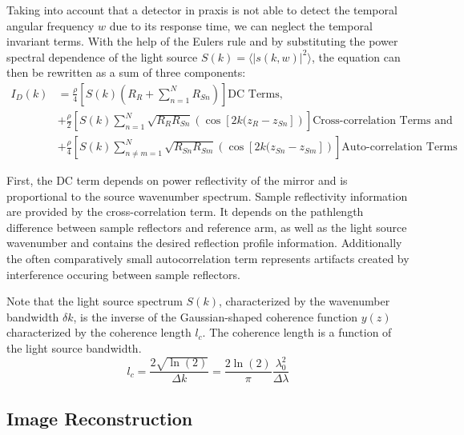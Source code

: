 Taking into account that a detector in praxis is not able to detect the temporal angular frequency \( w \) due to its response time, we can neglect the temporal invariant terms. With the help of the Eulers rule and by substituting the power spectral dependence of the light source \( S(k) = \langle \left| s(k,w) \right|^2 \rangle \), the equation can then be rewritten as a sum of three components:
\begin{equation}
\begin{aligned}
    I_D(k) & = \frac{\rho}{4} \left[ S(k) \left( R_R + \sum^{N}_{n=1} R_{Sn}\right) \right] \text{DC Terms,} \\
           & + \frac{\rho}{2} \left[ S(k)\sum^N_{n=1} \sqrt{R_R R_{Sn}} \left( \cos [2k(z_R - z_{Sn}] \right) \right] \text{Cross-correlation Terms and} \\
           & + \frac{\rho}{4} \left[ S(k)\sum^N_{n \ne m = 1} \sqrt{R_{Sn} R_{Sm}} \left( \cos [2k(z_{Sn} - z_{Sm}] \right) \right] \text{Auto-correlation Terms}
    \label{eq:untuitiveform}
\end{aligned}
\end{equation}

First, the DC term depends on power reflectivity of the mirror and is proportional to the source wavenumber spectrum. Sample reflectivity information are provided by the cross-correlation term. It depends on the pathlength difference between sample reflectors and reference arm, as well as the light source wavenumber and contains the desired reflection profile information. Additionally the often comparatively small autocorrelation term represents artifacts created by interference occuring between sample reflectors. 

Note that the light source spectrum \( S(k) \), characterized by the wavenumber bandwidth \( \delta k \), is the inverse of the Gaussian-shaped coherence function \( y(z) \) characterized by the coherence length \( l_c \). The coherence length is a function of the light source bandwidth. \cite{Kalkman.2017}
\begin{equation}
l_{c}=\frac{2 \sqrt{\ln (2)}}{\Delta k}=\frac{2 \ln (2)}{\pi} \frac{\lambda_{0}^{2}}{\Delta \lambda}
\label{eq:wavenumberlength}
\end{equation}

\subsection{Image Reconstruction}

